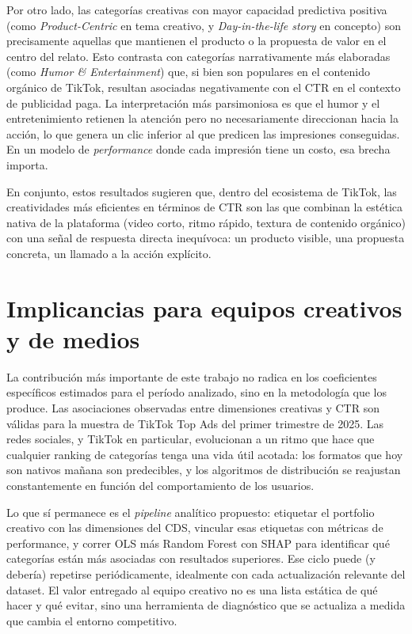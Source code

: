 \documentclass[12pt, a4paper]{report}
\begin{document}
Por otro lado, las categorías creativas con mayor capacidad predictiva positiva (como
\textit{Product-Centric} en tema creativo, y \textit{Day-in-the-life story} en concepto) son
precisamente aquellas que mantienen el producto o la propuesta de valor en el centro del
relato. Esto contrasta con categorías narrativamente más elaboradas (como
\textit{Humor \& Entertainment}) que, si bien son populares en el contenido orgánico de
TikTok, resultan asociadas negativamente con el CTR en el contexto de publicidad paga.
La interpretación más parsimoniosa es que el humor y el entretenimiento retienen la
atención pero no necesariamente direccionan hacia la acción, lo que genera un clic
inferior al que predicen las impresiones conseguidas. En un modelo de
\textit{performance} donde cada impresión tiene un costo, esa brecha importa.

En conjunto, estos resultados sugieren que, dentro del ecosistema de TikTok, las
creatividades más eficientes en términos de CTR son las que combinan la estética nativa
de la plataforma (video corto, ritmo rápido, textura de contenido orgánico) con una señal
de respuesta directa inequívoca: un producto visible, una propuesta concreta, un llamado
a la acción explícito.

\section{Implicancias para equipos creativos y de medios}

La contribución más importante de este trabajo no radica en los coeficientes específicos
estimados para el período analizado, sino en la metodología que los produce. Las
asociaciones observadas entre dimensiones creativas y CTR son válidas para la muestra de
TikTok Top Ads del primer trimestre de 2025. Las redes sociales, y TikTok en particular,
evolucionan a un ritmo que hace que cualquier ranking de categorías tenga una vida útil
acotada: los formatos que hoy son nativos mañana son predecibles, y los algoritmos de
distribución se reajustan constantemente en función del comportamiento de los usuarios.

Lo que sí permanece es el \textit{pipeline} analítico propuesto: etiquetar el portfolio
creativo con las dimensiones del CDS, vincular esas etiquetas con métricas de performance,
y correr OLS más Random Forest con SHAP para identificar qué categorías están más
asociadas con resultados superiores. Ese ciclo puede (y debería) repetirse periódicamente,
idealmente con cada actualización relevante del dataset. El valor entregado al equipo
creativo no es una lista estática de qué hacer y qué evitar, sino una herramienta de
diagnóstico que se actualiza a medida que cambia el entorno competitivo.
\end{document}
